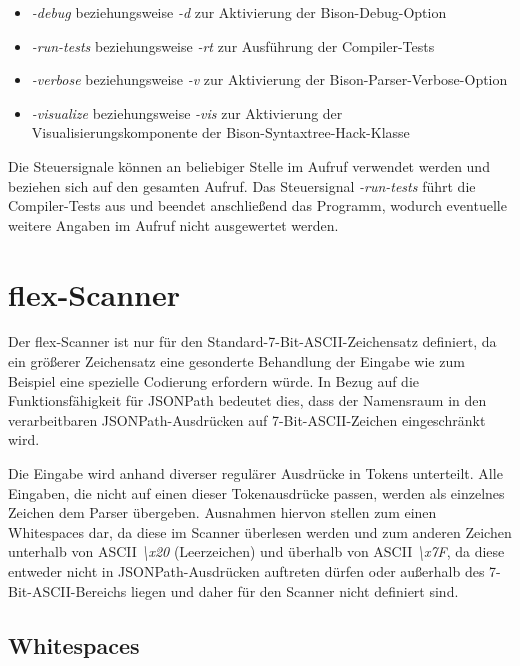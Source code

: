 \documentclass[oneside]{ausarbeitung}
\begin{document}
\begin{itemize}
	\item \textit{-debug} beziehungsweise \textit{-d} zur Aktivierung der Bison-Debug-Option
	\item \textit{-run-tests} beziehungsweise \textit{-rt} zur Ausführung der Compiler-Tests
	\item \textit{-verbose} beziehungsweise \textit{-v} zur Aktivierung der Bison-Parser-Verbose-Option
	\item \textit{-visualize} beziehungsweise \textit{-vis} zur Aktivierung der Visualisierungskomponente der Bison-Syntaxtree-Hack-Klasse
\end{itemize}

Die Steuersignale können an beliebiger Stelle im Aufruf verwendet werden und beziehen sich auf den gesamten Aufruf. Das Steuersignal \textit{-run-tests} führt die Compiler-Tests aus und beendet anschließend das Programm, wodurch eventuelle weitere Angaben im Aufruf nicht ausgewertet werden.


	
\section{flex-Scanner}

Der flex-Scanner ist nur für den Standard-7-Bit-ASCII-Zeichensatz definiert, da ein größerer Zeichensatz eine gesonderte Behandlung der Eingabe wie zum Beispiel eine spezielle Codierung erfordern würde. In Bezug auf die Funktionsfähigkeit für JSONPath bedeutet dies, dass der Namensraum in den verarbeitbaren JSONPath-Ausdrücken auf 7-Bit-ASCII-Zeichen eingeschränkt wird. 

Die Eingabe wird anhand diverser regulärer Ausdrücke in Tokens unterteilt. Alle Eingaben, die nicht auf einen dieser Tokenausdrücke passen, werden als einzelnes Zeichen dem Parser übergeben. Ausnahmen hiervon stellen zum einen Whitespaces dar, da diese im Scanner überlesen werden und zum anderen Zeichen unterhalb von ASCII \textit{\textbackslash x20} (Leerzeichen) und überhalb von ASCII \textit{\textbackslash x7F}, da diese entweder nicht in JSONPath-Ausdrücken auftreten dürfen oder außerhalb des 7-Bit-ASCII-Bereichs liegen und daher für den Scanner nicht definiert sind.



\subsection{Whitespaces}
\end{document}
